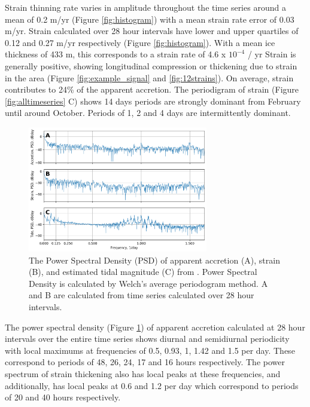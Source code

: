 Strain thinning rate varies in amplitude throughout the time series around a mean of 0.2 m/yr (Figure \ref{fig:histogram}) with a mean strain rate error of 0.03 m/yr. Strain calculated over 28 hour intervals have lower and upper quartiles of 0.12 and 0.27 m/yr  respectively (Figure \ref{fig:histogram}).   With a mean ice thickness of 433 m, this corresponds to a strain rate of 4.6 x $10^{-4}$ / yr
Strain is generally positive, showing longitudinal compression or thickening due to strain in the area (Figure \ref{fig:example_signal} and \ref{fig:12strains}). On average, strain contributes to  24\% of the apparent accretion. The periodigram of strain (Figure \ref{fig:alltimeseries} C) shows 14 days periods are strongly dominant from February until around October. %
Periods of 1, 2 and 4 days are intermittently dominant.

\begin{figure}[!ht]
\centering
\includegraphics[width=0.7\textwidth]{chapters/3/spectral_density.png}
\caption[]{The Power Spectral Density (PSD) of  apparent accretion (A), strain (B), and estimated tidal magnitude (C) from \cite{padman2002new}. Power Spectral Density is calculated by Welch's average periodogram method. A and B are calculated from time series calculated over 28 hour intervals.
}
\label{fig:spectral_density}
\end{figure}

The power spectral density (Figure \ref{fig:spectral_density}) of apparent accretion calculated at 28 hour intervals over the entire time series shows diurnal and semidiurnal periodicity with local maximums at frequencies of 0.5, 0.93, 1, 1.42 and 1.5 per day. These correspond to periods of 48, 26, 24, 17 and 16 hours respectively. The power spectrum of strain thickening also has local peaks at these frequencies, and additionally, has local peaks at 0.6 and 1.2 per day which correspond to periods of 20 and 40 hours respectively. 


